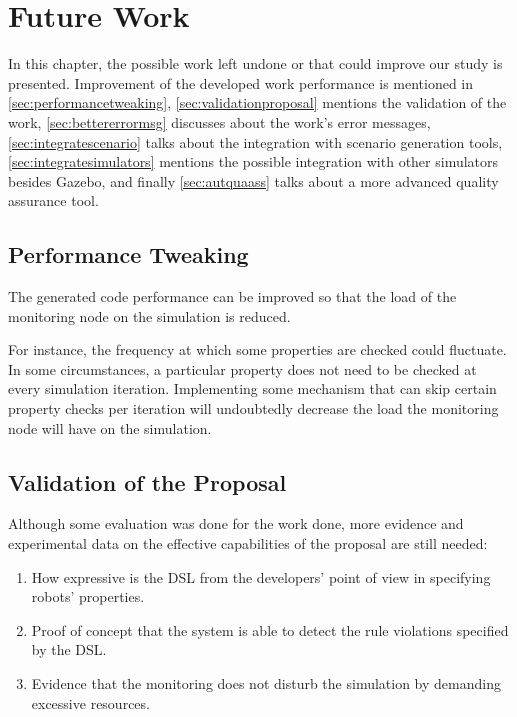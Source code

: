\chapter{Future Work}
\label{chap:futurework}

In this chapter, the possible work left undone or that could improve our study is presented.
Improvement of the developed work performance is mentioned in \autoref{sec:performancetweaking}, \autoref{sec:validationproposal} mentions the validation of the work, \autoref{sec:bettererrormsg} discusses about the work's error messages, \autoref{sec:integratescenario} talks about the integration with scenario generation tools, \autoref{sec:integratesimulators} mentions the possible integration with other simulators besides Gazebo, and finally \autoref{sec:autquaass} talks about a more advanced quality assurance tool.


\section{Performance Tweaking}
\label{sec:performancetweaking}

The generated code performance can be improved so that the load of the monitoring node on the simulation is reduced.

For instance, the frequency at which some properties are checked could fluctuate. In some circumstances, a particular property does not need to be checked at every simulation iteration. Implementing some mechanism that can skip certain property checks per iteration will undoubtedly decrease the load the monitoring node will have on the simulation.


\section{Validation of the Proposal}
\label{sec:validationproposal}

Although some evaluation was done for the work done, more evidence and experimental data on the effective capabilities of the proposal are still needed:

\begin{enumerate}
    \item How expressive is the DSL from the developers' point of view in specifying robots' properties.
    \item Proof of concept that the system is able to detect the rule violations specified by the DSL.
    \item Evidence that the monitoring does not disturb the simulation by demanding excessive resources.
\end{enumerate}


